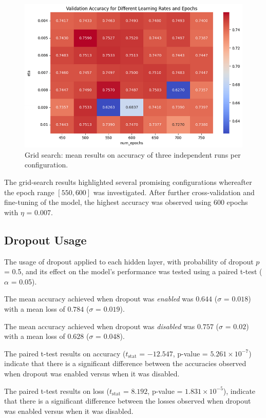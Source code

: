 \noindent
\begin{figure}[thpb]
    \centering
    \includegraphics[scale=0.35]{img/grid-search.png}
    \caption{Grid search: mean results on accuracy of three independent runs per configuration.}
\end{figure}

The grid-search results highlighted several promising configurations whereafter the epoch range $[550,600]$ was investigated.
After further cross-validation and fine-tuning of the model, the highest accuracy was observed using 600 epochs with $\eta$ = 0.007.

\subsection{Dropout Usage}

The usage of dropout applied to each hidden layer, with probability of dropout $p$ = 0.5, and its effect on the model's performance was tested using a paired t-test ($\alpha$ = 0.05). 

The mean accuracy achieved when dropout was {\sl enabled} was $0.644$ ($\sigma$ = $0.018$) with a mean loss of $0.784$ ($\sigma$ = $ 0.019$). 

The mean accuracy achieved when dropout was {\sl disabled} was $0.757$ ($\sigma$ = $0.02$) with a mean loss of $0.628$ ($\sigma$ = $0.048$).

The paired t-test results on accuracy ($t_{\text{stat}}$ = $-12.547$, p-value = $5.261 \times 10^{-7}$) indicate that there is
 a significant difference between the accuracies observed when dropout was enabled versus when it was disabled.

The paired t-test results on loss ($t_{\text{stat}}$ = $8.192$, 
p-value = $1.831 \times 10^{-5}$), indicate that there is a significant difference between the losses observed when dropout was 
enabled versus when it was disabled.

